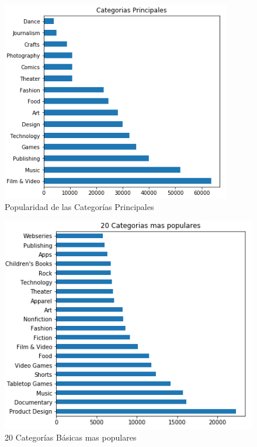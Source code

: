 \documentclass[journal]{IEEEtran}
\begin{document}
\begin{figure}[H]
    \centering
    \captionsetup{justification=centering}
    \includegraphics[width=\linewidth]{Images/Categorias.PNG}
    \caption{Popularidad de las Categorías Principales}
\end{figure}

\begin{figure}[H]
    \centering
    \captionsetup{justification=centering}
\includegraphics[width=\linewidth]{Images/40Categorias.PNG}
    \caption{20 Categorías Básicas mas populares}
\end{figure}
\end{document}
